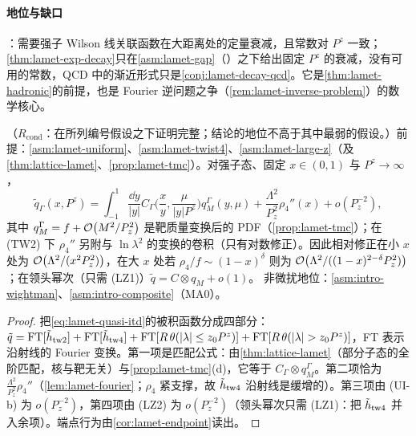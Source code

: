 \paragraph{地位与缺口}
\tagC：需要强子 Wilson 线关联函数在大距离处的定量衰减，且常数对 $P^z$ 一致；\cref{thm:lamet-exp-decay}只在\cref{asm:lamet-gap}（\tagC）之下给出固定 $P^z$ 的衰减，没有可用的常数，QCD 中的渐近形式只是\cref{conj:lamet-decay-qcd}。它是\cref{thm:lamet-hadronic}的前提，也是 Fourier 逆问题之争（\cref{rem:lamet-inverse-problem}）的数学核心。

\begin{theorem}\label{thm:lamet-hadronic}
（$R_{\mathrm{cond}}$：在所列编号假设之下证明完整；结论的地位不高于其中最弱的假设。）前提：\cref{asm:lamet-uniform}、\cref{asm:lamet-twist4}、\cref{asm:lamet-large-z}（及 \cref{thm:lattice-lamet}、\cref{prop:lamet-tmc}）。对强子态、固定 $x\in(0,1)$ 与 $P^z\to\infty$，
\begin{equation}\label{eq:lamet-hadronic}
\tilde q_\Gamma(x,P^z)=\int_{-1}^1\frac{\dd y}{|y|}C_\Gamma\Big(\frac xy,\frac\mu{|y|P^z}\Big)q^\Gamma_M(y,\mu)+\frac{\Lambda^2}{P_z^2}\rho_4''(x)+o(P_z^{-2}),
\end{equation}
其中 $q^\Gamma_M=f+\mathcal{O}\!\left(M^2/P_z^2\right)$ 是靶质量变换后的 PDF（\cref{prop:lamet-tmc}）；在 (TW2) 下 $\rho_4''$ 另附与 $\ln\lambda^2$ 的变换的卷积（只有对数修正）。因此相对修正在小 $x$ 处为 $\mathcal{O}\!\left(\Lambda^2/(x^2P_z^2)\right)$，在大 $x$ 处若 $\rho_4/f\sim(1-x)^\delta$ 则为 $\mathcal{O}\!\left(\Lambda^2/((1-x)^{2-\delta}P_z^2)\right)$；在领头幂次（只需 (LZ1)）$\tilde q=C\otimes q_M+o(1)$。
非微扰地位：\cref{asm:intro-wightman}、\cref{asm:intro-composite}（MA0）。
\end{theorem}

\begin{proof}
把\cref{eq:lamet-quasi-itd}的被积函数分成四部分：$\tilde q={\rm FT}[\tilde h_{\rm tw2}]+{\rm FT}[\tilde h_{\rm tw4}]+{\rm FT}[R\,\theta(|\lambda|\le z_0P^z)]+{\rm FT}[R\,\theta(|\lambda|>z_0P^z)]$，FT 表示沿射线的 Fourier 变换。第一项是匹配公式：由\cref{thm:lattice-lamet}（部分子态的全阶匹配，核与靶无关）与\cref{prop:lamet-tmc}(d)，它等于 $C_\Gamma\otimes q^\Gamma_M$。第二项恰为 $\frac{\Lambda^2}{P_z^2}\rho_4''$（\cref{lem:lamet-fourier}；$\rho_4$ 紧支撑，故 $\tilde h_{\rm tw4}$ 沿射线是缓增的）。第三项由 (UI-b) 为 $o(P_z^{-2})$，第四项由 (LZ2) 为 $o(P_z^{-2})$（领头幂次只需 (LZ1)：把 $\tilde h_{\rm tw4}$ 并入余项）。端点行为由\cref{cor:lamet-endpoint}读出。
\end{proof}

